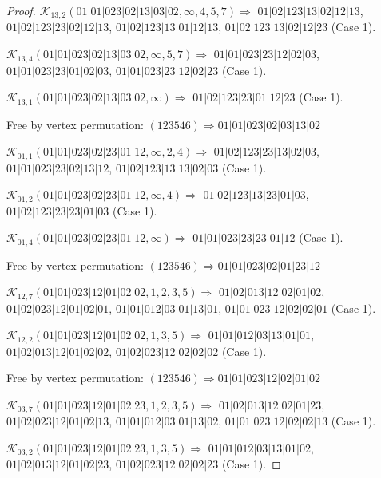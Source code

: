 \documentclass[12pt]{article}
\theoremstyle{plain}
\theoremstyle{definition}
\theoremstyle{remark}
\newcommand{\fancy}[1]{\mathcal{#1}}
\def\K{\fancy{K}}
\begin{document}
\begin{proof}
	\bigskip
	
	$\K_{13,2}(01|01|023|02|13|03|02,\infty,4, 5, 7)\Rightarrow $ $01|02|123|13|02|12|13$, $01|02|123|23|02|12|13$, $01|02|123|13|01|12|13$, $01|02|123|13|02|12|23$ (Case 1).
	
	$\K_{13,4}(01|01|023|02|13|03|02,\infty,5, 7)\Rightarrow $ $01|01|023|23|12|02|03$, $01|01|023|23|01|02|03$, $01|01|023|23|12|02|23$ (Case 1).
	
	$\K_{13,1}(01|01|023|02|13|03|02,\infty)\Rightarrow $ $01|02|123|23|01|12|23$ (Case 1).
	
	
	
	Free by vertex permutation: $(1 2 3 5 4 6)\Rightarrow 01|01|023|02|03|13|02$
	
	
	
	\bigskip
	
	$\K_{01,1}(01|01|023|02|23|01|12,\infty,2, 4)\Rightarrow $ $01|02|123|23|13|02|03$, $01|01|023|23|02|13|12$, $01|02|123|13|13|02|03$ (Case 1).
	
	$\K_{01,2}(01|01|023|02|23|01|12,\infty,4)\Rightarrow $ $01|02|123|13|23|01|03$, $01|02|123|23|23|01|03$ (Case 1).
	
	$\K_{01,4}(01|01|023|02|23|01|12,\infty)\Rightarrow $ $01|01|023|23|23|01|12$ (Case 1).
	
	
	
	Free by vertex permutation: $(1 2 3 5 4 6)\Rightarrow 01|01|023|02|01|23|12$
	
	
	
	\bigskip
	
	$\K_{12,7}(01|01|023|12|01|02|02,1, 2, 3, 5)\Rightarrow $ $01|02|013|12|02|01|02$, $01|02|023|12|01|02|01$, $01|01|012|03|01|13|01$, $01|01|023|12|02|02|01$ (Case 1).
	
	$\K_{12,2}(01|01|023|12|01|02|02,1, 3, 5)\Rightarrow $ $01|01|012|03|13|01|01$, $01|02|013|12|01|02|02$, $01|02|023|12|02|02|02$ (Case 1).
	
	
	
	Free by vertex permutation: $(1 2 3 5 4 6)\Rightarrow 01|01|023|12|02|01|02$
	
	
	
	\bigskip
	
	$\K_{03,7}(01|01|023|12|01|02|23,1, 2, 3, 5)\Rightarrow $ $01|02|013|12|02|01|23$, $01|02|023|12|01|02|13$, $01|01|012|03|01|13|02$, $01|01|023|12|02|02|13$ (Case 1).
	
	$\K_{03,2}(01|01|023|12|01|02|23,1, 3, 5)\Rightarrow $ $01|01|012|03|13|01|02$, $01|02|013|12|01|02|23$, $01|02|023|12|02|02|23$ (Case 1).
	

\end{proof}
\end{document}
